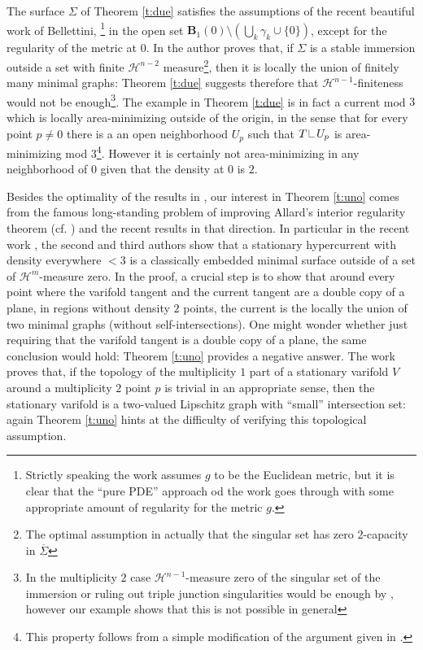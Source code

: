 \documentclass[reqno]{amsart}
\theoremstyle{definition}
\theoremstyle{remark}
\numberwithin{equation}{section}
\newcommand\res{\mathop{\hbox{\vrule height 7pt width .3pt depth 0pt\vrule height .3pt width 5pt depth 0pt}}\nolimits}
\begin{document}
The surface $\Sigma$ of Theorem \ref{t:due} satisfies the assumptions of the recent beautiful work \cite{Bellettini2025} of Bellettini, \footnote{Strictly speaking the work \cite{Bellettini2025} assumes $g$ to be the Euclidean metric, but it is clear that the  ``pure PDE'' approach od the work goes through with some appropriate amount of regularity for the metric $g$.} in the open set $\mathbf{B}_1 (0)\setminus (\bigcup_k \gamma_k \cup \{0\})$, except for the regularity of the metric at $0$. In \cite{Bellettini2025} the author proves that, if $\Sigma$ is a stable immersion outside a set with finite $\mathcal{H}^{n-2}$ measure\footnote{The optimal assumption in \cite{Bellettini2025} actually that the singular set has zero $2$-capacity in $\overline{\Sigma}$}, then it is locally the union of finitely many minimal graphs: Theorem \ref{t:due} suggests therefore that $\mathcal{H}^{n-1}$-finiteness would not be enough\footnote{In the multiplicity $2$ case $\mathcal H^{n-1}$-measure zero of the singular set of the immersion or ruling out triple junction singularities would be enough by \cite{MiWi}, however our example shows that this is not possible in general}. The example in Theorem \ref{t:due} is in fact a current mod $3$ which is locally area-minimizing outside of the origin, in the sense that for every point $p\neq 0$ there is a an open neighborhood $U_p$ such that $T\res U_p$ is area-minimizing mod $3$\footnote{This property follows from a simple modification of the argument given in \cite[Proof of Proposition 1.8]{DHMSS}.}. However it is certainly not area-minimizing in any neighborhood of $0$ given that the density at $0$ is $2$. 

Besides the optimality of the results in \cite{Bellettini2025}, our interest  in Theorem \ref{t:uno} comes from the famous long-standing problem of improving Allard's interior regularity theorem (cf. \cite{All}) and the recent results \cite{BMW,HS} in that direction. In particular in the recent work \cite{HS}, the second and third authors show that a stationary hypercurrent with density everywhere $<3$ is a classically embedded minimal surface outside of a set of $\mathcal{H}^m$-measure zero. In the proof, a crucial step is to show that around every point where the varifold tangent and the current tangent are a double copy of a plane, in regions without density $2$ points, the current is the locally the union of two minimal graphs (without self-intersections). One might wonder whether just requiring that the varifold tangent is a double copy of a plane, the same conclusion would hold: Theorem \ref{t:uno} provides a negative answer. The work \cite{BMW} proves that, if the topology of the multiplicity $1$ part of a stationary varifold $V$ around a multiplicity $2$ point $p$ is trivial in an appropriate sense, then the stationary varifold is a two-valued Lipschitz graph with ``small'' intersection set: again Theorem \ref{t:uno} hints at the difficulty of verifying this topological assumption.
\end{document}
